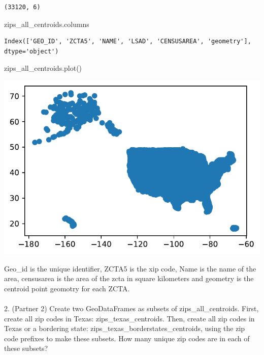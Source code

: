 \documentclass[
  letterpaper,
  DIV=11,
  numbers=noendperiod]{scrartcl}
\makeatletter
\let\oldparagraph\paragraph
\renewcommand{\paragraph}{
    \@ifstar
      \xxxParagraphStar
      \xxxParagraphNoStar
  }
\newcommand{\xxxParagraphStar}[1]{\oldparagraph*{#1}\mbox{}}
\newcommand{\xxxParagraphNoStar}[1]{\oldparagraph{#1}\mbox{}}
\newenvironment{Shaded}{\begin{snugshade}}{\end{snugshade}}
\newcommand{\NormalTok}[1]{\textcolor[rgb]{0.00,0.23,0.31}{#1}}
\makeatother
\begin{document}
\begin{verbatim}
(33120, 6)
\end{verbatim}

\begin{Shaded}
\begin{Highlighting}[]
\NormalTok{zips\_all\_centroids.columns}
\end{Highlighting}
\end{Shaded}

\begin{verbatim}
Index(['GEO_ID', 'ZCTA5', 'NAME', 'LSAD', 'CENSUSAREA', 'geometry'], dtype='object')
\end{verbatim}

\begin{Shaded}
\begin{Highlighting}[]
\NormalTok{zips\_all\_centroids.plot()}
\end{Highlighting}
\end{Shaded}

\includegraphics{ps4_files/figure-pdf/cell-17-output-1.pdf}

Geo\_id is the unique identifier, ZCTA5 is the xip code, Name is the
name of the area, censusarea is the area of the zcta in square
kilometers and geometry is the centroid point geomotry for each ZCTA.

\paragraph{2. (Partner 2) Create two GeoDataFrames as subsets of
zips\_all\_centroids. First, create all zip codes in Texas:
zips\_texas\_centroids. Then, create all zip codes in Texas or a
bordering state: zips\_texas\_borderstates\_centroids, using the zip
code prefixes to make these subsets. How many unique zip codes are in
each of these
subsets?}\label{partner-2-create-two-geodataframes-as-subsets-of-zips_all_centroids.-first-create-all-zip-codes-in-texas-zips_texas_centroids.-then-create-all-zip-codes-in-texas-or-a-bordering-state-zips_texas_borderstates_centroids-using-the-zip-code-prefixes-to-make-these-subsets.-how-many-unique-zip-codes-are-in-each-of-these-subsets}
\end{document}
